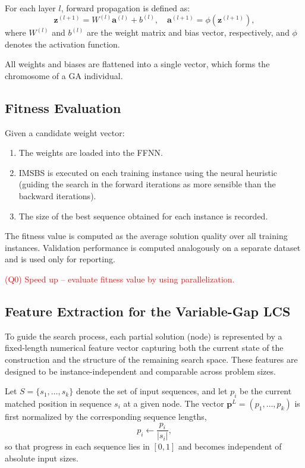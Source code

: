 \documentclass[11pt,a4paper]{article}
\begin{document}
For each layer $l$, forward propagation is defined as:
\[
\mathbf{z}^{(l+1)} = W^{(l)} \mathbf{a}^{(l)} + b^{(l)}, \quad
\mathbf{a}^{(l+1)} = \phi(\mathbf{z}^{(l+1)}),
\]
where $W^{(l)}$ and $b^{(l)}$ are the weight matrix and bias vector, respectively, and $\phi$ denotes the activation function.

All weights and biases are flattened into a single vector, which forms the chromosome of a GA individual.

\subsection{Fitness Evaluation}

Given a candidate weight vector:
\begin{enumerate}
    \item The weights are loaded into the FFNN.
    \item IMSBS is executed on each training instance using the neural heuristic (guiding the search in the forward iterations as more sensible than the backward iterations).
    \item The size of the best sequence obtained for each instance is recorded.
\end{enumerate}

The fitness value is computed as the average solution quality over all training instances. Validation performance is computed analogously on a separate dataset and is used only for reporting.

\textcolor{red}{(Q0) Speed up -- evaluate fitness value by using parallelization. }

\subsection{Feature Extraction for the Variable-Gap LCS}

To guide the search process, each partial solution (node) is represented by a fixed-length numerical feature vector capturing both the current state of the construction and the structure of the remaining search space. These features are designed to be instance-independent and comparable across problem sizes.

Let $S=\{s_1,\ldots, s_k\}$ denote the set of input sequences, and let $p_i$ be the current matched position in sequence $s_i$ at a given node. The vector $\mathbf{p}^L=(p_1,\ldots,p_k)$ is first normalized by the corresponding sequence lengths,
\[
p_i \leftarrow \frac{p_i}{|s_i|},
\]
so that progress in each sequence lies in $[0,1]$ and becomes independent of absolute input sizes.
\end{document}
